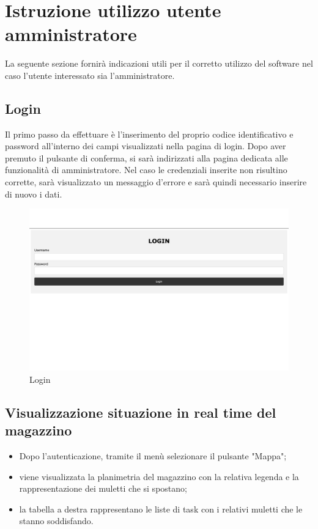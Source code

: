 \section{Istruzione utilizzo utente amministratore}

La seguente sezione fornirà indicazioni utili per il corretto utilizzo del software nel caso l'utente interessato sia l'amministratore.

\subsection{Login}
Il primo passo da effettuare è l'inserimento del proprio codice identificativo e password all'interno dei campi visualizzati nella pagina di login. Dopo aver premuto il pulsante di conferma, si sarà indirizzati alla pagina dedicata alle funzionalità di amministratore. Nel caso le credenziali inserite non risultino corrette, sarà visualizzato un messaggio d'errore e sarà quindi necessario inserire di nuovo i dati.
\begin{figure}[H]
    \centering
    \includegraphics[scale=0.12]{res/images/login.png}
    \caption{Login}
\end{figure}
\subsection{Visualizzazione situazione in real time del magazzino}
\begin{itemize}
    \item Dopo l'autenticazione, tramite il menù selezionare il pulsante "Mappa";
    \item viene visualizzata la planimetria del magazzino con la relativa legenda e la rappresentazione dei muletti che si spostano;
    \item la tabella a destra rappresentano le liste di task con i relativi muletti che le stanno soddisfando.
    
\end{itemize}


